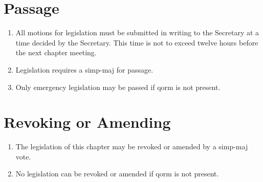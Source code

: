 	\section{Passage}
		\begin{enumerate}
			\item All motions for legislation must be submitted in writing to the Secretary at a time decided by the Secretary. This time is not to exceed twelve hours before the next chapter meeting. \label{legislation-time}

			\item Legislation requires a \gls{simp-maj} for passage. 

			\item Only emergency legislation may be passed if \gls{qorm} is not present.

		\end{enumerate}

	\section{Revoking or Amending}
		\begin{enumerate}
			\item The legislation of this chapter may be revoked or amended by a \gls{simp-maj} vote.
			\item No legislation can be revoked or amended if \gls{qorm} is not present.

		\end{enumerate}


